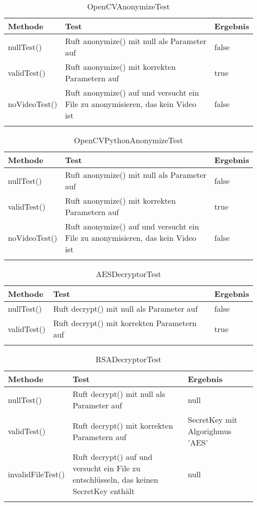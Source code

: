  \begin{longtable}{p{} | p{} | p{}}
\hline
  \textbf{Methode} & \textbf{Test} & \textbf{Ergebnis}\\
  \hline
  nullTest() & Ruft anonymize() mit null als Parameter auf & false\\
  \hline
  validTest() & Ruft anonymize() mit korrekten Parametern auf & true\\
  \hline
  noVideoTest() & Ruft anonymize() auf und versucht ein File zu anonymisieren, das kein Video ist & false\\
  \hline 
  \caption{OpenCVAnonymizeTest}
 \end{longtable}
 
 \begin{longtable}{p{} | p{} | p{}}
\hline
  \textbf{Methode} & \textbf{Test} & \textbf{Ergebnis}\\
  \hline
  nullTest() & Ruft anonymize() mit null als Parameter auf & false\\
  \hline
  validTest() & Ruft anonymize() mit korrekten Parametern auf & true\\
  \hline
  noVideoTest() & Ruft anonymize() auf und versucht ein File zu anonymisieren, das kein Video ist & false\\
  \hline 
  \caption{OpenCVPythonAnonymizeTest}
 \end{longtable}
 
 \begin{longtable}{p{} | p{} | p{}}
\hline
   \textbf{Methode} & \textbf{Test} & \textbf{Ergebnis}\\
  \hline
  nullTest() & Ruft decrypt() mit null als Parameter auf & false\\
  \hline
  validTest() & Ruft decrypt() mit korrekten Parametern auf & true\\
  \hline 
  \caption{AESDecryptorTest}
 \end{longtable}
 
 \begin{longtable}{p{} | p{} | p{}}
 \hline
 \textbf{Methode} & \textbf{Test} & \textbf{Ergebnis}\\
  \hline
  nullTest() & Ruft decrypt() mit null als Parameter auf & null\\
  \hline
  validTest() & Ruft decrypt() mit korrekten Parametern auf & SecretKey mit Algorighmus 'AES'\\
  \hline 
  invalidFileTest() & Ruft decrypt() auf und versucht ein File zu entschlüsseln, das keinen SecretKey enthält & null\\
  \hline
  \caption{RSADecryptorTest}
 \end{longtable}
 
